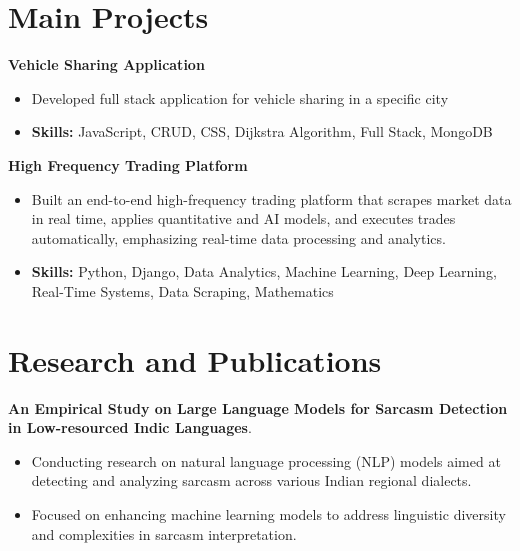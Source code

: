 \documentclass[a4paper,11pt]{article}
\begin{document}
\section{\textbf{Main Projects}}

\vspace{1mm}
  \textbf{Vehicle Sharing Application  }
\vspace{-1.5mm} %
\begin{itemize}
  \item Developed full stack application for vehicle sharing in a specific city
\vspace{-3mm}
  \item \textbf{Skills:} JavaScript, CRUD, CSS, Dijkstra Algorithm, Full Stack, MongoDB
\end{itemize}


\vspace{1mm}
   \textbf{High Frequency Trading Platform }
\vspace{-1.5mm} %
\begin{itemize}
  \item Built an end-to-end high-frequency trading platform that scrapes market data in real time, applies quantitative and AI models, and executes trades automatically, emphasizing real-time data processing and analytics.
\vspace{-3mm}
  \item \textbf{Skills:} Python, Django, Data Analytics, Machine Learning, Deep Learning, Real-Time Systems, Data Scraping, Mathematics
\end{itemize}



\section{\textbf{Research and Publications} \hfill }
\vspace{1mm}
  \textbf{An Empirical Study on Large Language Models for Sarcasm Detection in Low-resourced Indic Languages}.
\vspace{-1mm} %
\begin{itemize}
  \item Conducting research on natural language processing (NLP) models aimed at detecting and analyzing sarcasm across various Indian regional dialects.
\vspace{-3mm}
  \item Focused on enhancing machine learning models to address linguistic diversity and complexities in sarcasm interpretation.
\end{itemize}
\end{document}
